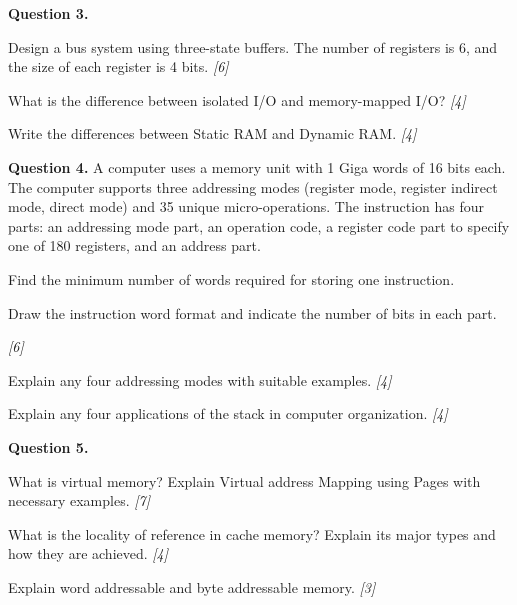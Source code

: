 \documentclass[11pt,a4paper]{article}
\newcommand{\pts}[1]{\hfill   \textit{[#1]}}
\begin{document}
\medskip


\noindent   \textbf{Question 3.}

\begin{parts}
  \item Design a bus system using three-state buffers. The number of registers is 6, and the size of each register is 4 bits. \pts{6}
  \item What is the difference between isolated I/O and memory-mapped I/O? \pts{4}
  \item Write the differences between Static RAM and Dynamic RAM. \pts{4}
\end{parts}

\medskip


\noindent   \textbf{Question 4.} A computer uses a memory unit with 1 Giga words of 16 bits each. The computer supports three addressing modes (register mode, register indirect mode, direct mode) and 35 unique micro-operations. The instruction has four parts: an addressing mode part, an operation code, a register code part to specify one of 180 registers, and an address part.

\begin{parts}
  \item
  
\begin{parts}
    \item Find the minimum number of words required for storing one instruction.
    \item Draw the instruction word format and indicate the number of bits in each part.
  \end{parts} \pts{6}
  \item Explain any four addressing modes with suitable examples. \pts{4}
  \item Explain any four applications of the stack in computer organization. \pts{4}
\end{parts}

\medskip


\noindent   \textbf{Question 5.}

\begin{parts}
  \item What is virtual memory? Explain Virtual address Mapping using Pages with necessary examples. \pts{7}
  \item What is the locality of reference in cache memory? Explain its major types and how they are achieved. \pts{4}
  \item Explain word addressable and byte addressable memory. \pts{3}
\end{parts}
\end{document}
